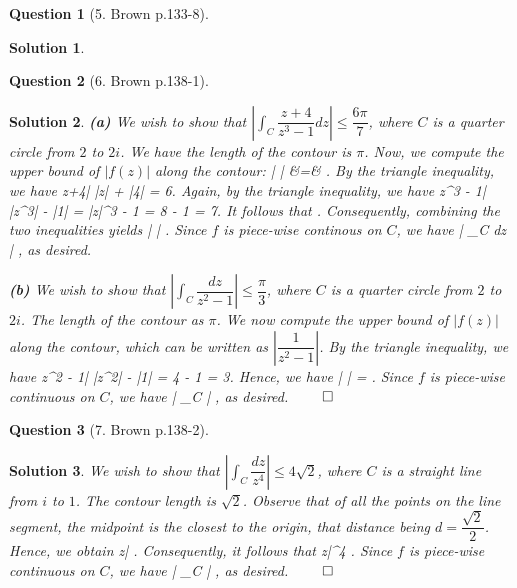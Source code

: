 \documentclass{article} %
\def\eQb#1\eQe{\begin{eqnarray*}#1\end{eqnarray*}}
\theoremstyle{quest}
\newtheorem*{question}{Question}
\newtheorem*{solution}{Solution}
\begin{document}
\bigskip

\begin{question}[5. Brown p.133-8]
\end{question}
\begin{solution}
\end{solution}

\bigskip

\begin{question}[6. Brown p.138-1]
\end{question}
\begin{solution}
\textbf{(a)} We wish to show that $|\int_{C} \dfrac{z+4}{z^3 - 1} dz | \leq \dfrac{6\pi}{7}$,
where $C$ is a quarter circle from $2$ to $2i$.
We have the length of the contour is $\pi$. 
Now, we compute the upper bound of $|f(z)|$ along the contour: 
\eQb
\left|  \right| &=& .
\eQe
By the triangle inequality, we have
\eQb
|z+4| \leq |z| + |4| = 6.
\eQe
Again, by the triangle inequality, we have
\eQb
|z^3 - 1| \geq |z^3| - |1| = |z|^3 - 1 = 8 - 1 = 7.
\eQe
It follows that
\eQb 
\dfrac{1}{|z^3 - 1|}  \leq {}.
\eQe
Consequently, combining the two inequalities yields 
\eQb
\left|  \right| \leq {}.
\eQe
Since $f$ is piece-wise continous on $C$, we have 
\eQb
\left| \int_{C}  dz \right|  \leq {},
\eQe
as desired. 

\smallskip

\textbf{(b)} We wish to show that 
$\left| \int_{C} \dfrac{dz}{z^2 -1} \right| \leq \dfrac{\pi}{3}$, where
$C$ is a quarter circle from $2$ to $2i$. 
The length of the contour as $\pi$. We now compute the upper bound
of $|f(z)|$ along the contour, which can be written as $\left| \dfrac{1}{z^2-1} \right|$.
By the triangle inequality, we have
\eQb
|z^2 - 1| \geq |z^2| - |1| = 4 - 1 = 3.
\eQe
Hence, we have
\eQb
\left|  \right| =  \leq {}. 
\eQe 
Since $f$ is piece-wise continuous on $C$, we have
\eQb
\left| \int_{C}  \right| \leq {}, 
\eQe 
as desired. $\qed$

\end{solution}

\bigskip

\begin{question}[7. Brown p.138-2]
\end{question}
\begin{solution}
We wish to show that $\left| \int_{C}  \dfrac{dz}{z^4} \right| \leq 4\sqrt{2}$, where
$C$ is a straight line from $i$ to $1$. The contour length is $\sqrt{2}$.
Observe that of all the points on the line segment, the midpoint is the closest to the origin,
that distance being $d = \dfrac{\sqrt{2}}{2}$. Hence, we obtain
\eQb
|z| \geq {}.
\eQe
Consequently, it follows that 
\eQb
|z|^4 \geq {}   .
\eQe
Since $f$ is piece-wise continuous on $C$, we have 
\eQb
\left| \int_{C}  \right| , 
\eQe
as desired. $\qed$
\end{solution}
\end{document}
